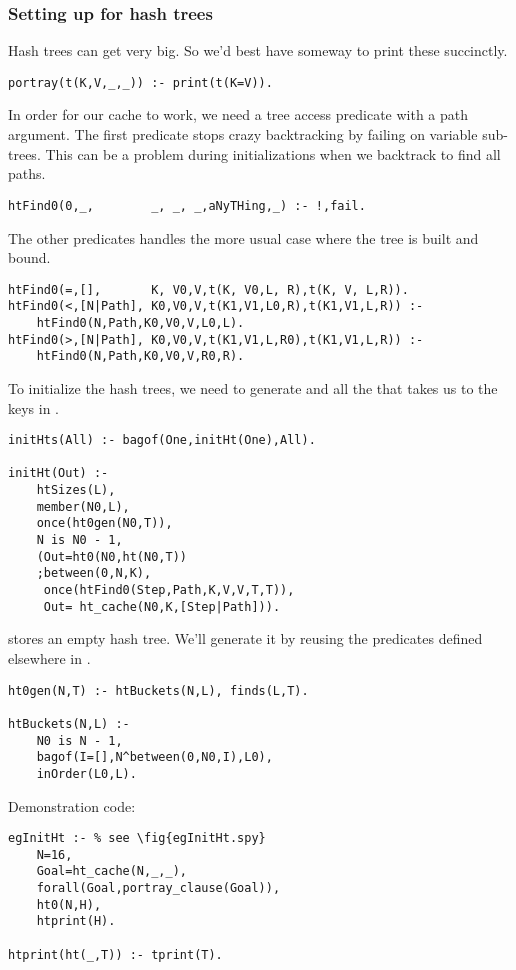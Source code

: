 \subsubsection{Setting up for hash trees
}
\label{sec:settingupht}
Hash trees can get very big.
So we'd best have
someway to print these succinctly.
\begin{Verbatim}
portray(t(K,V,_,_)) :- print(t(K=V)).
\end{Verbatim}
In order for our cache to work, we need a tree access
predicate with a path argument.
%
The first predicate stops crazy backtracking by
failing on variable sub-trees. This can be a problem
during initializations
when we backtrack to find all paths.
\begin{Verbatim}
htFind0(0,_,        _, _, _,aNyTHing,_) :- !,fail.
\end{Verbatim}
The other predicates handles the more usual
case where the tree is built and bound.
\begin{Verbatim}
htFind0(=,[],       K, V0,V,t(K, V0,L, R),t(K, V, L,R)).
htFind0(<,[N|Path], K0,V0,V,t(K1,V1,L0,R),t(K1,V1,L,R)) :-
	htFind0(N,Path,K0,V0,V,L0,L).
htFind0(>,[N|Path], K0,V0,V,t(K1,V1,L,R0),t(K1,V1,L,R)) :-
	htFind0(N,Path,K0,V0,V,R0,R).
\end{Verbatim}
To initialize the hash trees, we need to generate
 and all the  that takes us
to the keys in .
\begin{Verbatim}
initHts(All) :- bagof(One,initHt(One),All).

initHt(Out) :-
	htSizes(L),
	member(N0,L),
	once(ht0gen(N0,T)),
	N is N0 - 1,
	(Out=ht0(N0,ht(N0,T))
    ;between(0,N,K),
	 once(htFind0(Step,Path,K,V,V,T,T)),
	 Out= ht_cache(N0,K,[Step|Path])).
\end{Verbatim}
 stores 
an empty hash tree. We'll generate it by
reusing the  predicates defined
elsewhere in .
\begin{Verbatim}
ht0gen(N,T) :- htBuckets(N,L), finds(L,T).

htBuckets(N,L) :-
	N0 is N - 1,
	bagof(I=[],N^between(0,N0,I),L0),
	inOrder(L0,L).
\end{Verbatim}
Demonstration code:
\begin{Verbatim}
egInitHt :- % see \fig{egInitHt.spy}
	N=16,
	Goal=ht_cache(N,_,_),
	forall(Goal,portray_clause(Goal)),
	ht0(N,H),
	htprint(H).

htprint(ht(_,T)) :- tprint(T).
\end{Verbatim}
